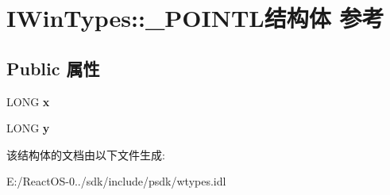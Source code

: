 \hypertarget{struct_i_win_types_1_1___p_o_i_n_t_l}{}\section{I\+Win\+Types\+:\+:\+\_\+\+P\+O\+I\+N\+T\+L结构体 参考}
\label{struct_i_win_types_1_1___p_o_i_n_t_l}
\subsection*{Public 属性}
\begin{DoxyCompactItemize}
\item 
\mbox{\label{struct_i_win_types_1_1___p_o_i_n_t_l_a4d88cc3886ed778f859ee0c36824ce92}} 
L\+O\+NG {\bfseries x}
\item 
\mbox{\label{struct_i_win_types_1_1___p_o_i_n_t_l_a385ccbe8351723afcfc458bc4d468ec1}} 
L\+O\+NG {\bfseries y}
\end{DoxyCompactItemize}


该结构体的文档由以下文件生成\+:\begin{DoxyCompactItemize}
\item 
E\+:/\+React\+O\+S-\/0../sdk/include/psdk/wtypes.\+idl\end{DoxyCompactItemize}
